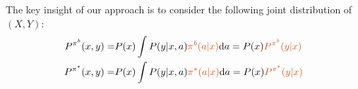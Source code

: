 The key insight of our approach is to consider the following joint distribution of $(X,Y)$:
\begin{align*}
    P^{\pi^{b}}(x, y)=& P(x) \int P(y| x, a) \textcolor{red}{\pi^{b}(a|x)} \mathrm{d}a  =P(x) \textcolor{red}{P^{\pi^{b}}(y|x)} \\
    P^{\pi^*}(x, y) =& P(x)\int P(y| x, a) \textcolor{red}{\pi^*(a|x)}  \mathrm{d}a = P(x)\textcolor{red}{P^{\pi^*}(y|x)}
\end{align*}

